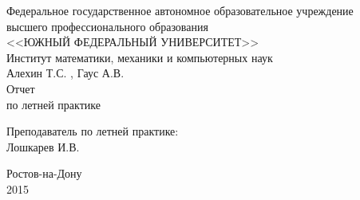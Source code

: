 \begin{titlepage}
\begin{center}
	Федеральное государственное автономное образовательное учреждение\\
	высшего профессионального образования\\
	\MakeUppercase{<<ЮЖНЫЙ ФЕДЕРАЛЬНЫЙ УНИВЕРСИТЕТ>>}\\[1cm]
	Институт математики, механики и компьютерных наук\\[1cm]
	\vspace*{\fill}
	{\LARGE Алехин Т.С. , Гаус А.В.\\Отчет\\по летней практике}
	\vspace*{\fill}
\begin{flushright}
	Преподаватель по летней практике:\\ Лошкарев И.В.
\end{flushright}
	\vspace*{\fill}
	Ростов-на-Дону\\
	2015
\end{center}
\end{titlepage}